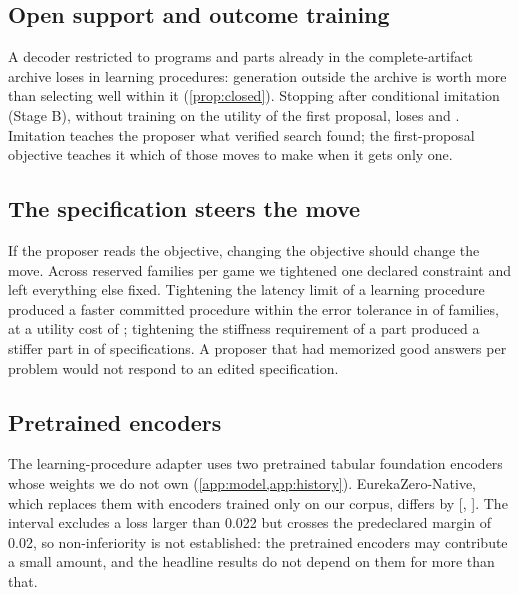 \subsection{Open support and outcome training}

A decoder restricted to programs and parts already in the complete-artifact archive loses
\syn[EZ-G09]{\EZabCatA} in learning procedures: generation outside the archive is worth more than
selecting well within it (\cref{prop:closed}). Stopping after conditional imitation (Stage B),
without training on the utility of the first proposal, loses \syn[EZ-G09]{\EZabImitA} and
\syn[EZ-G09]{\EZabImitC}. Imitation teaches the proposer what verified search found; the first-proposal
objective teaches it which of those moves to make when it gets only one.

\subsection{The specification steers the move}

If the proposer reads the objective, changing the objective should change the move. Across
\syn[EZ-G10]{\EZsteerN} reserved families per game we tightened one declared constraint and left
everything else fixed. Tightening the latency limit of a learning procedure produced a faster
committed procedure within the error tolerance in \syn[EZ-G10]{\EZsteerA\%} of families, at a utility
cost of \syn[EZ-G10]{\EZsteerCostA}; tightening the stiffness requirement of a part produced a stiffer
part in \syn[EZ-G10]{\EZsteerC\%} of specifications. A proposer that had memorized good answers per
problem would not respond to an edited specification.

\subsection{Pretrained encoders}

The learning-procedure adapter uses two pretrained tabular foundation encoders whose weights we do not
own (\cref{app:model,app:history}). EurekaZero-Native, which replaces them with encoders trained only
on our corpus, differs by \syn[EZ-G12]{\EZnativeA} [\syn[EZ-G12]{\EZnativeAlo},
\syn[EZ-G12]{\EZnativeAhi}]. The interval excludes a loss larger than 0.022 but crosses the
predeclared margin of 0.02, so non-inferiority is not established: the pretrained encoders may
contribute a small amount, and the headline results do not depend on them for more than that.

